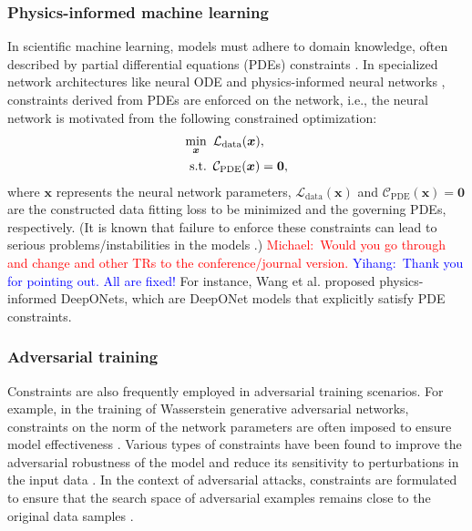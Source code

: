 \documentclass[aos]{imsart}
\numberwithin{equation}{section}
\theoremstyle{plain}
\newcommand{\michael}[1]{\textcolor{red}{Michael:\ #1}}
\newcommand{\yihang}[1]{\textcolor{blue}{Yihang:\ #1}}
\begin{document}
\subsubsection{Physics-informed machine learning}

In scientific machine learning, models must adhere to domain knowledge, often described by partial differential equations (PDEs) constraints \cite{failure21_TR,Cuomo2022Scientific,differentiable_hard_22_TR,learnConservation1_TR}. In specialized network architectures like neural ODE \cite{chen2018neural} and physics-informed neural networks \cite{raissi2019physics, karniadakis2021physics, failure21_TR}, constraints derived from PDEs are enforced on the network, i.e.,
the neural network is motivated from the following constrained optimization:
\begin{equation*}
    \begin{split}
        \min_{\bm{x}} & \hspace{0.5em} \mathcal{L}_{\text{data}}(\bm{x}), \\
        \text{s.t.} & \hspace{0.5em} \mathcal{C}_{\text{PDE}}(\bm{x}) = \bm{0},
    \end{split}
\end{equation*}
where $\bm{x}$ represents the neural network parameters, $\mathcal{L}_{\text{data}}(\bm{x})$ and $\mathcal{C}_{\text{PDE}}(\bm{x}) = \bm{0}$ are the constructed data fitting loss to be minimized and the governing PDEs, respectively. 
(It is known that failure to enforce these constraints can lead to serious problems/instabilities in the models \cite{failure21_TR,differentiable_hard_22_TR,learnConservation1_TR}.)
\michael{Would you go through and change \cite{failure21_TR,differentiable_hard_22_TR,learnConservation1_TR} and other TRs to the conference/journal version.  }
\yihang{Thank you for pointing out. All are fixed!}
For instance, Wang et al. \cite{wang2021learning} proposed physics-informed DeepONets, which are DeepONet models that explicitly satisfy PDE constraints. 


\subsubsection{Adversarial training}
Constraints are also frequently employed in adversarial training scenarios. 
For example, in the training of Wasserstein generative adversarial networks, constraints on the norm of the network parameters are often imposed to ensure model effectiveness \cite{arjovsky2017wasserstein}. Various types of constraints have been found to improve the adversarial robustness of the model and reduce its sensitivity to perturbations in the input data \cite{cisse2017parseval}. In the context of adversarial attacks, constraints are formulated to ensure that the search space of adversarial examples remains close to the original data samples \cite{goodfellow2014explaining, su2019one, zhu2023adversarial}.
\end{document}
